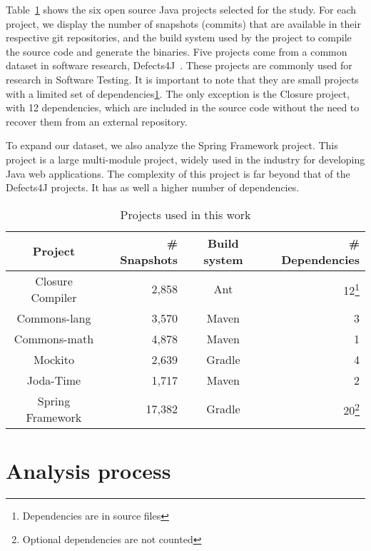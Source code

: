 Table~\ref{table:projects} shows the six open source Java projects selected for the study.
For each project, we display the number of snapshots (commits) that are available in their respective git repositories, and the build system used by the project to compile the source code and generate the binaries.
Five projects come from a common dataset in software research, Defects4J~\cite{Just:2014:DDE:2610384.2628055}.
These projects are commonly used for research in Software Testing.
It is important to note that they are small projects with a limited set of dependencies\ref{table:projects}.
The only exception is the Closure project, with 12 dependencies, which are included in the source code without the need to recover them from an external repository.

To expand our dataset, we also analyze the Spring Framework project.
This project is a large multi-module project, widely used in the industry for developing Java web applications.
The complexity of this project is far beyond that of the Defects4J projects.
It has as well a higher number of dependencies.

\begin{savenotes}
	\begin{table}
		\caption{Projects used in this work}
		\label{table:projects}
		\centering
		\begin{tabular}{crcr}
			\toprule
			\bf{Project} & \bf{\# Snapshots} & \bf{{Build system}} & \bf{\# Dependencies}\\ 
			\midrule
			Closure Compiler & 2,858 & Ant & 12\footnote{Dependencies are in source files}\\
			Commons-lang & 3,570 & Maven & 3\\
			Commons-math & 4,878 & Maven & 1\\
			Mockito & 2,639 & Gradle & 4\\
			Joda-Time & 1,717 & Maven & 2\\
			Spring Framework & 17,382 & Gradle & 20\footnote{Optional dependencies are not counted}\\
			\bottomrule
		\end{tabular}
	
	\end{table}
\end{savenotes}

\section{Analysis process}

